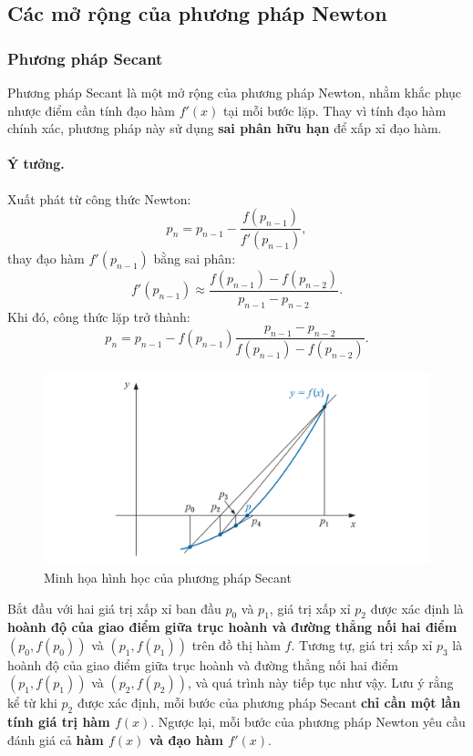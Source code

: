 \subsection{Các mở rộng của phương pháp Newton}
\subsubsection{Phương pháp Secant}
Phương pháp Secant là một mở rộng của phương pháp Newton, 
nhằm khắc phục nhược điểm cần tính đạo hàm $f'(x)$ tại mỗi bước lặp. 
Thay vì tính đạo hàm chính xác, phương pháp này sử dụng \textbf{sai phân hữu hạn} để xấp xỉ đạo hàm.

\paragraph*{Ý tưởng.}
Xuất phát từ công thức Newton:
\[
    p_{n} = p_{n-1} - \frac{f(p_{n-1})}{f'(p_{n-1})},
\]
thay đạo hàm $f'(p_{n-1})$ bằng sai phân:
\[
    f'(p_{n-1}) \approx 
    \frac{f(p_{n-1}) - f(p_{n-2})}{p_{n-1} - p_{n-2}}.
\]
Khi đó, công thức lặp trở thành:
\[
    p_{n} = p_{n-1} - f(p_{n-1})
    \frac{p_{n-1} - p_{n-2}}{f(p_{n-1}) - f(p_{n-2})}.
\]

\begin{figure}[H]
    \centering
    \includegraphics[width=1\linewidth]{figures/secant.png}
    \caption{Minh họa hình học của phương pháp Secant}
    \label{fig:placeholder}
\end{figure}

Bắt đầu với hai giá trị xấp xỉ ban đầu $p_0$ và $p_1$, 
giá trị xấp xỉ $p_2$ được xác định là \textbf{hoành độ của giao điểm giữa trục hoành và đường thẳng nối hai điểm} $(p_0, f(p_0))$ và $(p_1, f(p_1))$ trên đồ thị hàm $f$. Tương tự, giá trị xấp xỉ $p_3$ là hoành độ của giao điểm giữa trục hoành và đường thẳng nối hai điểm $(p_1, f(p_1))$ và $(p_2, f(p_2))$, và quá trình này tiếp tục như vậy.
Lưu ý rằng kể từ khi $p_2$ được xác định, mỗi bước của phương pháp Secant \textbf{chỉ cần một lần tính giá trị hàm $f(x)$}. 
Ngược lại, mỗi bước của phương pháp Newton yêu cầu đánh giá cả 
\textbf{hàm $f(x)$ và đạo hàm $f'(x)$}.

